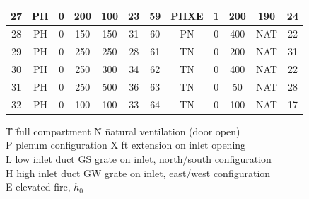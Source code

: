 \begin{table}[p]
\begin{center}
\begin{tabular}{|c|c|c|c|c|c||c|c|c|c|c|c|}
27   & PH      & 0     & 200        & 100       & 23          &   59   & PHXE    & 1     & 200        & 190       & 24          \\ \hline
28   & PH      & 0     & 150        & 150       & 31          &   60   & PN      & 0     & 400        & NAT       & 22          \\ \hline
29   & PH      & 0     & 250        & 250       & 28          &   61   & TN      & 0     & 200        & NAT       & 31          \\ \hline
30   & PH      & 0     & 250        & 300       & 34          &   62   & TN      & 0     & 400        & NAT       & 22          \\ \hline
31   & PH      & 0     & 250        & 500       & 36          &   63   & TN      & 0     & 50         & NAT       & 28          \\ \hline
32   & PH      & 0     & 100        & 100       & 33          &   64   & TN      & 0     & 100        & NAT       & 17          \\ \hline
\end{tabular}
\end{center}
\begin{tabbing}
\hspace{0.7in} \= T \hspace{0.2in}  \= full compartment     \hspace{0.8in} \= N \hspace{0.2in} \= natural ventilation (door open) \\
               \> P                 \> plenum configuration                \> X                 ft extension on inlet opening \\
               \> L                 \> low inlet duct                      \> GS               \> grate on inlet, north/south configuration \\
               \> H                 \> high inlet duct                     \> GW               \> grate on inlet, east/west configuration \\
               \> E                 \> elevated fire, $h_0$
\end{tabbing}
\label{LLNL_Matrix}
\end{table}


